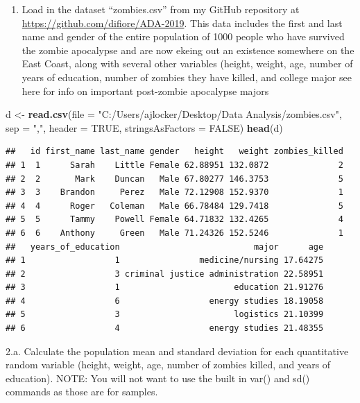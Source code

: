 \documentclass[]{article}
\newenvironment{Shaded}{\begin{snugshade}}{\end{snugshade}}
\newcommand{\KeywordTok}[1]{\textcolor[rgb]{0.13,0.29,0.53}{\textbf{#1}}}
\newcommand{\DataTypeTok}[1]{\textcolor[rgb]{0.13,0.29,0.53}{#1}}
\newcommand{\StringTok}[1]{\textcolor[rgb]{0.31,0.60,0.02}{#1}}
\newcommand{\OtherTok}[1]{\textcolor[rgb]{0.56,0.35,0.01}{#1}}
\newcommand{\NormalTok}[1]{#1}
\providecommand{\tightlist}{%
  \setlength{\itemsep}{0pt}\setlength{\parskip}{0pt}}
\begin{document}
\begin{enumerate}
\def\labelenumi{\arabic{enumi}.}
\setcounter{enumi}{1}
\tightlist
\item
  Load in the dataset ``zombies.csv'' from my GitHub repository at
  \url{https://github.com/difiore/ADA-2019}. This data includes the
  first and last name and gender of the entire population of 1000 people
  who have survived the zombie apocalypse and are now ekeing out an
  existence somewhere on the East Coast, along with several other
  variables (height, weight, age, number of years of education, number
  of zombies they have killed, and college major see here for info on
  important post-zombie apocalypse majors
\end{enumerate}

\begin{Shaded}
\begin{Highlighting}[]
\NormalTok{d <-}\StringTok{ }\KeywordTok{read.csv}\NormalTok{(}\DataTypeTok{file =} \StringTok{"C:/Users/ajlocker/Desktop/Data Analysis/zombies.csv"}\NormalTok{, }\DataTypeTok{sep =} \StringTok{","}\NormalTok{, }\DataTypeTok{header =}  \OtherTok{TRUE}\NormalTok{, }\DataTypeTok{stringsAsFactors =} \OtherTok{FALSE}\NormalTok{)}
\KeywordTok{head}\NormalTok{(d)}
\end{Highlighting}
\end{Shaded}

\begin{verbatim}
##   id first_name last_name gender   height   weight zombies_killed
## 1  1      Sarah    Little Female 62.88951 132.0872              2
## 2  2       Mark    Duncan   Male 67.80277 146.3753              5
## 3  3    Brandon     Perez   Male 72.12908 152.9370              1
## 4  4      Roger   Coleman   Male 66.78484 129.7418              5
## 5  5      Tammy    Powell Female 64.71832 132.4265              4
## 6  6    Anthony     Green   Male 71.24326 152.5246              1
##   years_of_education                           major      age
## 1                  1                medicine/nursing 17.64275
## 2                  3 criminal justice administration 22.58951
## 3                  1                       education 21.91276
## 4                  6                  energy studies 18.19058
## 5                  3                       logistics 21.10399
## 6                  4                  energy studies 21.48355
\end{verbatim}

2.a. Calculate the population mean and standard deviation for each
quantitative random variable (height, weight, age, number of zombies
killed, and years of education). NOTE: You will not want to use the
built in var() and sd() commands as those are for samples.
\end{document}
